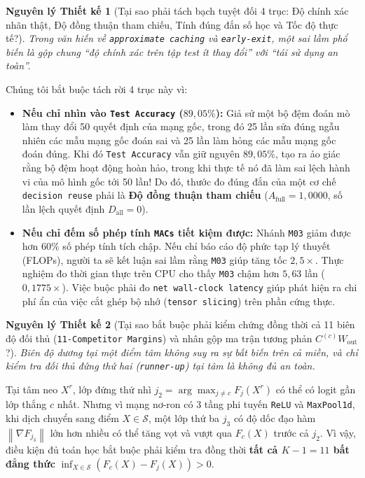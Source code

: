 \documentclass[11pt,a4paper]{article}
\newcommand{\norm}[1]{\left\lVert #1\right\rVert}
\newcommand{\code}[1]{{\small\ttfamily\nolinkurl{#1}}}
\newcommand{\Sset}{\mathcal{S}}
\newtheorem{principle}{Nguyên lý Thiết kế}[section]
\begin{document}
\begin{principle}[Tại sao phải tách bạch tuyệt đối 4 trục: Độ chính xác nhãn thật, Độ đồng thuận tham chiếu, Tính đúng đắn số học và Tốc độ thực tế?]
Trong văn hiến về \code{approximate caching} và \code{early-exit}, một sai lầm phổ biến là gộp chung ``độ chính xác trên tập test ít thay đổi'' với ``tái sử dụng an toàn''.
\end{principle}
Chúng tôi bắt buộc tách rời 4 trục này vì:
\begin{itemize}
  \item \textbf{Nếu chỉ nhìn vào \code{Test Accuracy} ($89,05\%$):} Giả sử một bộ đệm đoán mò làm thay đổi 50 quyết định của mạng gốc, trong đó 25 lần sửa đúng ngẫu nhiên các mẫu mạng gốc đoán sai và 25 lần làm hỏng các mẫu mạng gốc đoán đúng. Khi đó \code{Test Accuracy} vẫn giữ nguyên $89,05\%$, tạo ra ảo giác rằng bộ đệm hoạt động hoàn hảo, trong khi thực tế nó đã làm sai lệch hành vi của mô hình gốc tới 50 lần! Do đó, thước đo đúng đắn của một cơ chế \code{decision reuse} phải là \textbf{Độ đồng thuận tham chiếu} ($A_{\text{full}} = 1,0000$, số lần lệch quyết định $D_{\text{all}} = 0$).
  \item \textbf{Nếu chỉ đếm số phép tính \code{MACs} tiết kiệm được:} Nhánh \code{M03} giảm được hơn $60\%$ số phép tính tích chập. Nếu chỉ báo cáo độ phức tạp lý thuyết (FLOPs), người ta sẽ kết luận sai lầm rằng \code{M03} giúp tăng tốc $2,5\times$. Thực nghiệm đo thời gian thực trên CPU cho thấy \code{M03} chậm hơn $5,63$ lần ($0,1775\times$). Việc buộc phải đo \code{net wall-clock latency} giúp phát hiện ra chi phí ẩn của việc cắt ghép bộ nhớ (\code{tensor slicing}) trên phần cứng thực.
\end{itemize}

\begin{principle}[Tại sao bắt buộc phải kiểm chứng đồng thời cả 11 biên độ đối thủ (\code{11-Competitor Margins}) và nhân gộp ma trận tương phản $C^{(c)} W_{\text{out}}$?]
Biên độ dương tại một điểm tâm không suy ra sự bất biến trên cả miền, và chỉ kiểm tra đối thủ đứng thứ hai (\code{runner-up}) tại tâm là không đủ an toàn.
\end{principle}
Tại tâm neo $X^r$, lớp đứng thứ nhì $j_2 = \arg\max_{j \neq c} F_j(X^r)$ có thể có logit gần lớp thắng $c$ nhất. Nhưng vì mạng nơ-ron có 3 tầng phi tuyến \code{ReLU} và \code{MaxPool1d}, khi dịch chuyển sang điểm $X \in \Sset$, một lớp thứ ba $j_3$ có độ dốc đạo hàm $\norm{\nabla F_{j_3}}$ lớn hơn nhiều có thể tăng vọt và vượt qua $F_c(X)$ trước cả $j_2$. Vì vậy, điều kiện đủ toán học bắt buộc phải kiểm tra đồng thời \textbf{tất cả $K-1 = 11$ bất đẳng thức} $\inf_{X \in \Sset} (F_c(X) - F_j(X)) > 0$.
\end{document}
